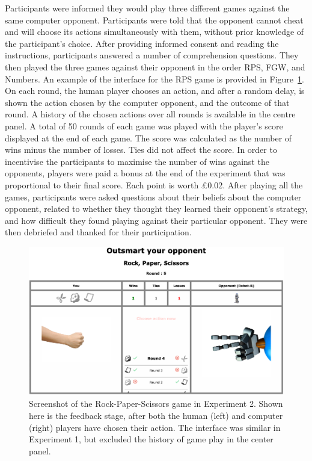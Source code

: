 \documentclass[man,floatsintext]{apa6}
\begin{document}
Participants were informed they would play three different games against the same computer opponent. Participants were told that the opponent cannot cheat and will choose its actions simultaneously with them, without prior knowledge of the participant's choice. After providing informed consent and reading the instructions, participants answered a number of comprehension questions. They then played the three games against their opponent in the order RPS, FGW, and Numbers. An example of the interface for the RPS game is provided in Figure~\ref{fig:feedback-rps-exp2}. On each round, the human player chooses an action, and after a random delay, is shown the action chosen by the computer opponent, and the outcome of that round. A history of the chosen actions over all rounds is available in the centre panel. A total of 50 rounds of each game was played with the player's score displayed at the end of each game. The score was calculated as the number of wins minus the number of losses. Ties did not affect the score. In order to incentivise the participants to maximise the number of wins against the opponents, players were paid a bonus at the end of the experiment that was proportional to their final score. Each point is worth £0.02. After playing all the games, participants were asked questions about their beliefs about the computer opponent, related to whether they thought they learned their opponent's strategy, and how difficult they found playing against their particular opponent. They were then debriefed and thanked for their participation.

\begin{figure}

{\centering \includegraphics{images/feedback_rps} 

}

\caption{Screenshot of the Rock-Paper-Scissors game in Experiment 2. Shown here is the feedback stage, after both the human (left) and computer (right) players have chosen their action. The interface was similar in Experiment 1, but excluded the history of game play in the center panel.}\label{fig:feedback-rps-exp2}
\end{figure}
\end{document}
